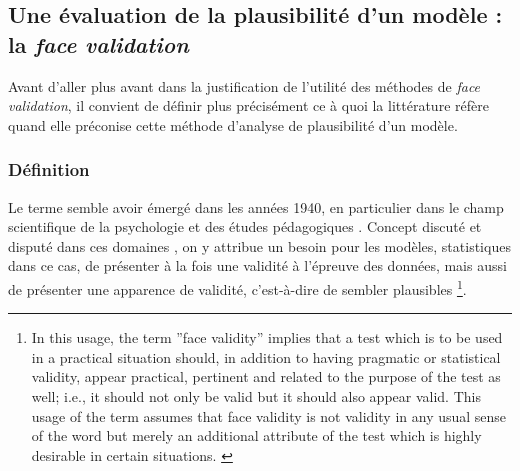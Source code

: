 \subsection{Une évaluation de la plausibilité d'un modèle : la \og \textit{face validation}\fg{}}\label{subsec:face-validity}

Avant d'aller plus avant dans la justification de l'utilité des méthodes de \textit{face validation}, il convient de définir plus précisément ce à quoi la littérature réfère quand elle préconise cette méthode d'analyse de plausibilité d'un modèle.

\subsubsection{Définition}
Le terme semble avoir émergé dans les années 1940, en particulier dans le champ scientifique de la psychologie et des études pédagogiques \autocite{nevo_face_1985}.
Concept discuté et disputé dans ces domaines \autocite{mosier_critical_1947}, on y attribue un besoin pour les modèles, statistiques dans ce cas, de présenter à la fois une validité à l'épreuve des données, mais aussi de présenter une apparence de validité, c'est-à-dire de sembler plausibles
\footnote{
	\og In this usage, the term ''face validity'' implies that a test which is to be used in a practical situation should, in addition to having pragmatic or statistical validity, appear practical, pertinent and related to the purpose of the test as well; i.e., it should not only be valid but it should also appear valid. This usage of the term assumes that \og face validity\fg{} is not validity in any usual sense of the word but merely an additional attribute of the test which is highly desirable in certain situations.\fg{} \cite[192]{mosier_critical_1947}
}.

